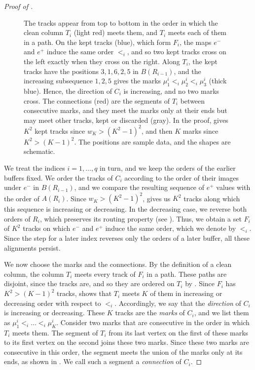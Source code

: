 \documentclass[fontsize=12pt,leading=14pt]{fullpaper}
\newcounter{step}
\begin{document}
\begin{proof}[Proof of ]
\begin{figure}[ht]
{      The tracks appear from top to bottom in the order in which the clean column $T_i$ (light red) meets them, and $T_i$ meets each of them in a path.
      On the kept tracks (blue), which form $F_i$, the maps $e^-$ and $e^+$ induce the same order $<_i$, and so two kept tracks cross on the left exactly when they cross on the right.
      Along $T_i$, the kept tracks have the positions $3,1,6,2,5$ in $B(R_{i-1})$, and the increasing subsequence $1,2,5$ gives the marks $\mu^i_1<_i\mu^i_2<_i\mu^i_3$ (thick blue).
      Hence, the direction of $C_i$ is increasing, and no two marks cross.
      The connections (red) are the segments of $T_i$ between consecutive marks, and they meet the marks only at their ends but may meet other tracks, kept or discarded (gray).
      In the proof,  gives $K^2$ kept tracks since $w_K>(K^2-1)^2$, and then $K$ marks since $K^2>(K-1)^2$.
    The positions are sample data, and the shapes are schematic.}
    \label{fig:s3-marks}
  \end{figure}

  We treat the indices $i=1,\dots,q$ in turn, and we keep the orders of the earlier buffers fixed.
  We order the tracks of $C_i$ according to the order of their images under $e^-$ in $B(R_{i-1})$, and we compare the resulting sequence of $e^+$ values with the order of $A(R_i)$.
  Since $w_K>(K^2-1)^2$,  gives us $K^2$ tracks along which this sequence is increasing or decreasing.
  In the decreasing case, we reverse both orders of $R_i$, which preserves its routing property (see ).
  Thus, we obtain a set $F_i$ of $K^2$ tracks on which $e^-$ and $e^+$ induce the same order, which we denote by $<_i$.
  Since the step for a later index reverses only the orders of a later buffer, all these alignments persist.

  We now choose the marks and the connections.
  By the definition of a clean column, the column $T_i$ meets every track of $F_i$ in a path.
  These paths are disjoint, since the tracks are, and so they are ordered on $T_i$ by .
  Since $F_i$ has $K^2>(K-1)^2$ tracks,  shows that $T_i$ meets $K$ of them in increasing or decreasing order with respect to $<_i$.
  Accordingly, we say that the \emph{direction} of $C_i$ is increasing or decreasing.
  These $K$ tracks are the \emph{marks} of $C_i$, and we list them as $\mu^i_1<_i\dots<_i\mu^i_K$.
  Consider two marks that are consecutive in the order in which $T_i$ meets them.
  The segment of $T_i$ from its last vertex on the first of these marks to its first vertex on the second joins these two marks.
  Since these two marks are consecutive in this order, the segment meets the union of the marks only at its ends, as shown in .
  We call such a segment a \emph{connection} of $C_i$.


\end{proof}
\end{document}
